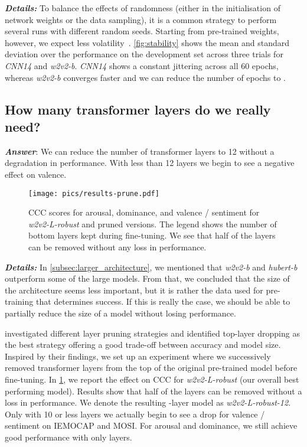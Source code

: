 \documentclass{article}
\newcommand\cnn{\mbox{\emph{CNN14}}}
\newcommand\wbase{\mbox{\emph{w2v2-b}}}
\newcommand\hbase{\mbox{\emph{hubert-b}}}
\newcommand\wrobust{\mbox{\emph{w2v2-L-robust}}}
\newcommand\wrobustpruned{\mbox{\emph{w2v2-L-robust-12}}}
\newcommand\iemocap{\mbox{IEMOCAP}}
\newcommand\mosi{\mbox{MOSI}}
\begin{document}
\noindent
\emph{\textbf{Details:}}
To balance the effects of randomness
(either in the initialisation of network weights or the data sampling),
it is a common strategy to perform several runs with different random seeds. 
Starting from pre-trained weights, however, we expect less volatility~\citep{erhan2010does, neyshabur2020being}. 
\cref{fig:stability} shows the mean and standard deviation
over the performance on the development set across three trials for {\cnn} and {\wbase}. 
{\cnn} shows a constant jittering across all 60 epochs,
whereas {\wbase} converges faster
and we can reduce the number of epochs to . 






\subsection{How many transformer layers do we really need?}
\label{subsec:prune}


\emph{\textbf{Answer}}:
We can reduce the number of transformer layers to 12 without a degradation in performance.
With less than 12 layers we begin to see a negative effect on valence.

\begin{figure}[t]
    \centering
    \texttt{[image: pics/results-prune.pdf]}
    \caption{
        \ac{CCC} scores for arousal, dominance, and valence / sentiment for \emph{\wrobust}
        and pruned versions.
        The legend shows the number of bottom layers kept during fine-tuning.
        We see that half of the layers can be removed without any loss in performance.
    }
    \label{fig:pruning}
\end{figure}

\noindent
\emph{\textbf{Details:}}
In \cref{subsec:larger_architecture},
we mentioned that {\wbase} and {\hbase} outperform some of the large models.
From that, we concluded that the size of the architecture seems less important,
but it is rather the data used for pre-training that determines success. 
If this is really the case,
we should be able to partially reduce the size of a model without losing performance.

\citet{sajjad2021poor} investigated different layer pruning strategies
and identified top-layer dropping as the best strategy offering a good trade-off between accuracy and model size. 
Inspired by their findings,
we set up an experiment where we successively removed transformer layers from the top of the original pre-trained model before fine-tuning. 
In \cref{fig:pruning}, we report the effect on CCC for {\wrobust} (our overall best performing model). 
Results show that half of the layers can be removed without a loss in performance. 
We denote the resulting -layer model as {\wrobustpruned}.
Only with 10 or less layers we actually begin to see a drop for valence / sentiment on {\iemocap} and {\mosi}. 
For arousal and dominance, we still achieve good performance with only  layers.
\end{document}
